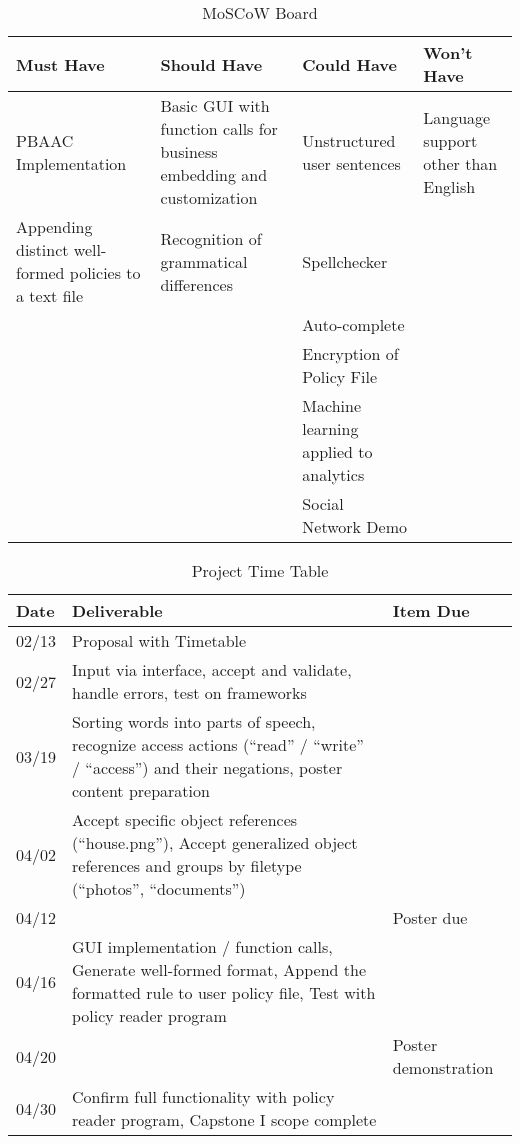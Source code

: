\documentclass[12pt]{article}
\begin{document}
\begin{table}[p]
    \begin{center}
        \begin{tabular}{ | m{1.3in} | m{1.3in}| m{1.3in} | m{1.3in} | } 
        \hline
        Must Have & Should Have & Could Have & Won't Have \\ 
        \hline
        \hline
        PBAAC Implementation & Basic GUI with function calls for business embedding and customization & Unstructured user sentences & Language support other than English \\ 
        \hline
        Appending distinct well-formed policies to a text file & Recognition of grammatical differences & Spellchecker &   \\ 
        \hline
          &   & Auto-complete &   \\ 
        \hline
          &   & Encryption of Policy File &   \\ 
        \hline
          &   & Machine learning applied to analytics &   \\ 
        \hline
          &   & Social Network Demo &   \\ 
        \hline
        \end{tabular}
        \caption{MoSCoW Board}
        \label{table:1}
    \end{center}
\end{table}

\begin{table}[p]
    \begin{center}
        \begin{tabular}{ | m{0.4in} | m{4in}| m{1.6in} | }
        \hline
        Date & Deliverable & Item Due \\ 
        \hline
        02/13 & Proposal with Timetable &   \\ 
        \hline
        02/27 & Input via interface, accept and validate, handle errors, test on frameworks &   \\ 
        \hline
        03/19 & Sorting words into parts of speech, recognize access actions (“read” / “write” / “access”) and their negations, poster content preparation &   \\ 
        \hline
        04/02 & Accept specific object references (“house.png”), Accept generalized object references and groups by filetype (“photos”, “documents”) &   \\ 
        \hline
        04/12 &   & Poster due \\ 
        \hline
        04/16 & GUI implementation / function calls, Generate well-formed format, Append the formatted rule to user policy file, Test with policy reader program &   \\
        \hline
        04/20 &   & Poster demonstration \\ 
        \hline
        04/30 & Confirm full functionality with policy reader program, Capstone I scope complete &   \\ 
        \hline
        \end{tabular}
        \caption{Project Time Table}
        \label{table:2}
    \end{center}
\end{table}



\end{document}
